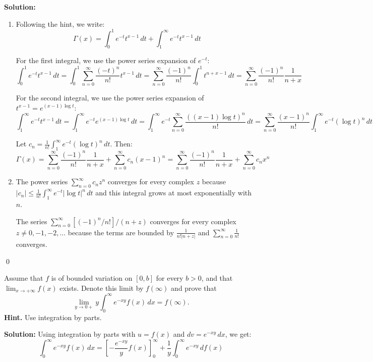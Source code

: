 \noindent\textbf{Solution:}
\begin{enumerate}[label=(\alph*)]
    \item Following the hint, we write:
    \[\Gamma(x) = \int_0^1 e^{-t} t^{x-1} \, dt + \int_1^\infty e^{-t} t^{x-1} \, dt\]
    
    For the first integral, we use the power series expansion of $e^{-t}$:
    \[\int_0^1 e^{-t} t^{x-1} \, dt = \int_0^1 \sum_{n=0}^{\infty} \frac{(-t)^n}{n!} t^{x-1} \, dt = \sum_{n=0}^{\infty} \frac{(-1)^n}{n!} \int_0^1 t^{n+x-1} \, dt = \sum_{n=0}^{\infty} \frac{(-1)^n}{n!} \frac{1}{n + x}\]
    
    For the second integral, we use the power series expansion of $t^{x-1} = e^{(x-1)\log t}$:
    \[\int_1^\infty e^{-t} t^{x-1} \, dt = \int_1^\infty e^{-t} e^{(x-1)\log t} \, dt = \int_1^\infty e^{-t} \sum_{n=0}^{\infty} \frac{((x-1)\log t)^n}{n!} \, dt = \sum_{n=0}^{\infty} \frac{(x-1)^n}{n!} \int_1^\infty e^{-t} (\log t)^n \, dt\]
    
    Let $c_n = \frac{1}{n!} \int_1^\infty e^{-t} (\log t)^n \, dt$. Then:
    \[\Gamma(x) = \sum_{n=0}^{\infty} \frac{(-1)^n}{n!} \frac{1}{n + x} + \sum_{n=0}^{\infty} c_n (x-1)^n = \sum_{n=0}^{\infty} \frac{(-1)^n}{n!} \frac{1}{n + x} + \sum_{n=0}^{\infty} c_n x^n\]
    
    \item The power series $\sum_{n=0}^{\infty} c_n z^n$ converges for every complex $z$ because $|c_n| \leq \frac{1}{n!} \int_1^\infty e^{-t} |\log t|^n \, dt$ and this integral grows at most exponentially with $n$.
    
    The series $\sum_{n=0}^{\infty} [(-1)^n / n!]/(n + z)$ converges for every complex $z \neq 0, -1, -2, \ldots$ because the terms are bounded by $\frac{1}{n! |n + z|}$ and $\sum_{n=0}^{\infty} \frac{1}{n!}$ converges.
\end{enumerate}\qed


\begin{problembox}
Assume that $f$ is of bounded variation on $[0, b]$ for every $b > 0$, and that $\lim_{x \to +\infty} f(x)$ exists. Denote this limit by $f(\infty)$ and prove that
\[\lim_{y \to 0+} y \int_0^\infty e^{-xy}f(x) \, dx = f(\infty).\]
\textbf{Hint.} Use integration by parts.
\end{problembox}

\noindent\textbf{Solution:}
Using integration by parts with $u = f(x)$ and $dv = e^{-xy} \, dx$, we get:
\[\int_0^\infty e^{-xy}f(x) \, dx = \left[-\frac{e^{-xy}}{y} f(x)\right]_0^\infty + \frac{1}{y} \int_0^\infty e^{-xy} \, df(x)\]


